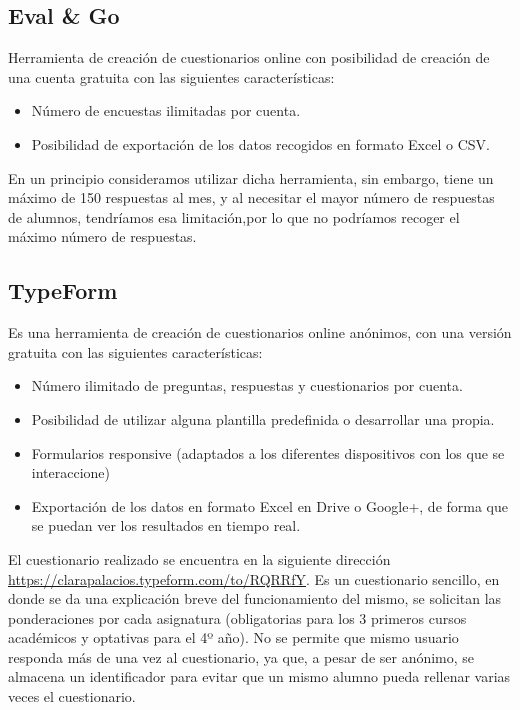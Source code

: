 \subsection{Eval \& Go}
Herramienta de creación de cuestionarios online con posibilidad de creación de una cuenta gratuita con las siguientes características: 
\begin{itemize}
\item Número de encuestas ilimitadas por cuenta. 
\item Posibilidad de exportación de los  datos  recogidos en formato Excel o CSV. 
\end{itemize}
En un principio consideramos utilizar dicha herramienta, sin embargo, tiene un máximo de 150 respuestas al mes, y al necesitar el mayor número de respuestas de alumnos, tendríamos esa limitación,por lo que no podríamos recoger el máximo número de respuestas. \nocite{carl:encuestas}
\subsection{TypeForm}
Es una herramienta de creación de cuestionarios online anónimos, con una versión gratuita con las siguientes características: 
\begin{itemize}
\item Número ilimitado de preguntas, respuestas y cuestionarios por cuenta. 
\item Posibilidad de utilizar alguna plantilla predefinida o desarrollar una propia. 
\item Formularios responsive (adaptados a los diferentes dispositivos con los que se interaccione) 
\item Exportación de los datos en formato Excel en Drive o Google+, de forma que se puedan ver los resultados en tiempo real. 
\end{itemize}
El cuestionario realizado se encuentra en la siguiente dirección \url{https://clarapalacios.typeform.com/to/RQRRfY}. Es un cuestionario sencillo,  en donde se da una explicación breve del funcionamiento del mismo, se solicitan las ponderaciones por cada asignatura (obligatorias para los 3 primeros cursos académicos y optativas para el 4º año). No se permite que mismo usuario responda más de una vez al cuestionario, ya que, a pesar de ser anónimo, se almacena un identificador para evitar que un mismo alumno pueda rellenar varias veces el cuestionario.  	



